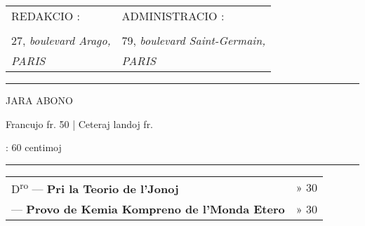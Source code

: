{\centering
\begin{tabu} to \textwidth{YY}
\scriptsize REDAKCIO : & \scriptsize ADMINISTRACIO : \\
 &  \\
\footnotesize 27, {\it boulevard Arago,} & \footnotesize 79, {\it boulevard Saint-Germain,} \\
\footnotesize\it PARIS & \footnotesize\it PARIS
\end{tabu}

\rule{13mm}{0.4pt}

{\scriptsize JARA ABONO\par}

Francujo  fr. 50 | Ceteraj landoj  fr.

\footnotesize{} : 60 centimoj\par

\rule{\textwidth}{0.4pt}
}
\begin{tabu} to 
\footnotesize D\textsuperscript{ro}  — {\bf Pri la Teorio de l’Jonoj} \dotfill & \footnotesize » 30\\
\footnotesize {} — {\bf Provo de Kemia Kompreno de l’Monda Etero} \dotfill & \footnotesize » 30
\end{tabu}


